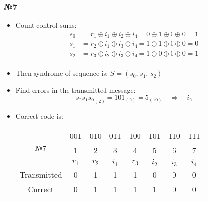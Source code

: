 \documentclass[12pt]{article}
\begin{document}
	\subsubsection{\Large №7}
	\begin{itemize}
		\item  Count control sums:
		\begin{align*}
			s_{0} &= r_{1}\oplus i_{1}\oplus i_{2}\oplus i_{4}=0\oplus1\oplus0\oplus0=1\\
			s_{1} &= r_{2}\oplus i_{1}\oplus i_{3}\oplus i_{4}=1\oplus1\oplus0\oplus0=0\\
			s_{2} &= r_{3}\oplus i_{2}\oplus i_{3}\oplus i_{4}=1\oplus0\oplus0\oplus0=1\\
		\end{align*}
		\item Then syndrome of sequence is: \(S = (s_{0},\,s_{1},\,s_{2})\)
		\item Find errors in the transmitted message: \[\overline{s_{2}s_{1}s_{0}}_{(2)} = 101_{(2)}=5_{(10)} \quad \Rightarrow \quad i_{2}\]
		\item Correct code is:
		\begin{table}[h!]
			\centering
			\begin{tabular}{ |c|c|c|c|c|c|c|c| } 
				\hline
				\multirow{3}{4em}{\centering№7} & 001 & 010 & 011 & 100 & 101 & 110 & 111 \\
				& 1 & 2 & 3 & 4 & 5 & 6 & 7 \\ 
				& \(r_{1}\) & \(r_{2}\) & \(i_{1}\) & \(r_{3}\) & \(i_{2}\) & \(i_{3}\) & \(i_{4}\) \\
				\hline 
				Transmitted & 0 & 1 & 1 & 1 & 0 & 0 & 0 \\ 
				\hline
				Correct & 0 & 1 & 1 & 1 & 1 & 0 & 0\\
				\hline
			\end{tabular}
		\end{table}
	\end{itemize}
\end{document}
